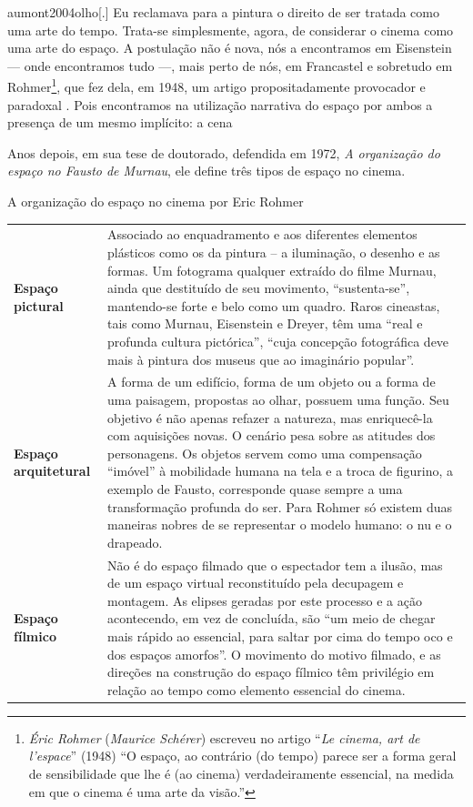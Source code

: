 \begin{displaycquote}[141]{aumont2004olho}[.]
	Eu reclamava para a pintura o direito de ser tratada como uma arte do
	tempo. Trata-se simplesmente, agora, de considerar o cinema como uma
	arte do espaço. A postulação não é nova, nós a encontramos em Eisenstein
	--- onde encontramos tudo ---, mais perto de nós, em Francastel e sobretudo
	em Rohmer\footnote{\emph{Éric Rohmer} (\emph{Maurice Schérer}) escreveu
		no artigo \enquote{\emph{Le cinema, art de l'espace}} (1948) \enquote{O espaço, ao
			contrário (do tempo) parece ser a forma geral de sensibilidade que lhe
			é (ao cinema) verdadeiramente essencial, na medida em que o cinema é
			uma arte da visão.}}, que fez dela, em 1948, um artigo
	propositadamente provocador e paradoxal \textelp{}. Pois encontramos na
	utilização narrativa do espaço por ambos \textelp{} a presença de um mesmo
	implícito: a cena
\end{displaycquote}

Anos depois, em sua tese de doutorado, defendida em 1972, \emph{A
	organização do espaço no Fausto de Murnau}, ele define três tipos de
espaço no cinema.

\begin{quadro}[h]
	\caption{A organização do espaço no cinema por Eric Rohmer}

	\begin{tabular}{lm{.7\linewidth}}
		\toprule
		\textbf{Espaço pictural}     & Associado ao enquadramento e aos diferentes
		elementos plásticos como os da pintura -- a iluminação, o desenho e as
		formas. Um fotograma qualquer extraído do filme Murnau, ainda que
		destituído de seu movimento, \enquote{sustenta-se}, mantendo-se forte e belo
		como um quadro. Raros cineastas, tais como Murnau, Eisenstein e Dreyer,
		têm uma \enquote{real e profunda cultura pictórica}, \enquote{cuja concepção
			fotográfica deve mais à pintura dos museus que ao imaginário
			popular}.\tabularnewline
		\addlinespace
		\textbf{Espaço arquitetural} & A forma de um edifício, forma de um
		objeto ou a forma de uma paisagem, propostas ao olhar, possuem uma
		função. Seu objetivo é não apenas refazer a natureza, mas enriquecê-la
		com aquisições novas. O cenário pesa sobre as atitudes dos personagens.
		Os objetos servem como uma compensação \enquote{imóvel} à mobilidade humana na
		tela e a troca de figurino, a exemplo de Fausto, corresponde quase
		sempre a uma transformação profunda do ser. Para Rohmer só existem duas
		maneiras nobres de se representar o modelo humano: o nu e o
		drapeado.\tabularnewline
		\addlinespace
		\textbf{Espaço fílmico}      & Não é do espaço filmado que o espectador tem a
		ilusão, mas de um espaço virtual reconstituído pela decupagem e
		montagem. As elipses geradas por este processo e a ação acontecendo, em
		vez de concluída, são \enquote{um meio de chegar mais rápido ao essencial, para
			saltar por cima do tempo oco e dos espaços amorfos}. O movimento do
		motivo filmado, e as direções na construção do espaço fílmico têm
		privilégio em relação ao tempo como elemento essencial do
		cinema.\tabularnewline
		\bottomrule
	\end{tabular}
\end{quadro}

